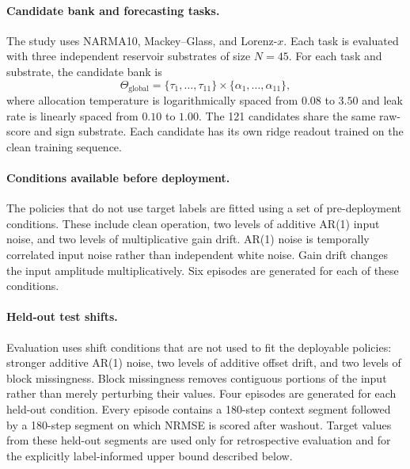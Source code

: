 \documentclass[preprint,12pt,authoryear]{elsarticle}
\begin{document}
\paragraph{Candidate bank and forecasting tasks.}
The study uses NARMA10, Mackey--Glass, and Lorenz-$x$. Each task is evaluated with three independent reservoir substrates of size $N=45$. For each task and substrate, the candidate bank is
\begin{equation}
  \Theta_{\mathrm{global}}
  =\{\tau_1,\ldots,\tau_{11}\}\times\{\alpha_1,\ldots,\alpha_{11}\},
\end{equation}
where allocation temperature is logarithmically spaced from $0.08$ to $3.50$ and leak rate is linearly spaced from $0.10$ to $1.00$. The 121 candidates share the same raw-score and sign substrate. Each candidate has its own ridge readout trained on the clean training sequence.

\paragraph{Conditions available before deployment.}
The policies that do not use target labels are fitted using a set of pre-deployment conditions. These include clean operation, two levels of additive AR(1) input noise, and two levels of multiplicative gain drift. AR(1) noise is temporally correlated input noise rather than independent white noise. Gain drift changes the input amplitude multiplicatively. Six episodes are generated for each of these conditions.

\paragraph{Held-out test shifts.}
Evaluation uses shift conditions that are not used to fit the deployable policies: stronger additive AR(1) noise, two levels of additive offset drift, and two levels of block missingness. Block missingness removes contiguous portions of the input rather than merely perturbing their values. Four episodes are generated for each held-out condition. Every episode contains a 180-step context segment followed by a 180-step segment on which NRMSE is scored after washout. Target values from these held-out segments are used only for retrospective evaluation and for the explicitly label-informed upper bound described below.
\end{document}
